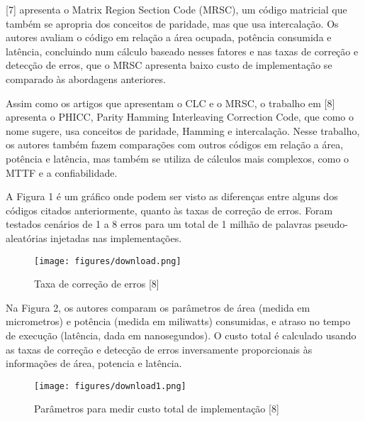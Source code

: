 [7] apresenta o Matrix Region Section Code (MRSC), um código matricial que também se apropria dos conceitos de paridade, mas que usa intercalação. Os autores avaliam o código em relação a área ocupada, potência consumida e latência, concluindo num cálculo baseado nesses fatores e nas taxas de correção e detecção de erros, que o MRSC apresenta baixo custo de implementação se comparado às abordagens anteriores.

Assim como os artigos que apresentam o CLC e o MRSC, o trabalho em [8] apresenta o PHICC, Parity Hamming Interleaving Correction Code, que como o nome sugere, usa conceitos de paridade, Hamming e intercalação.  Nesse trabalho, os autores também fazem comparações com outros códigos em relação a área, potência e latência, mas também se utiliza de cálculos mais complexos, como o MTTF e a confiabilidade.

A Figura 1 é um gráfico onde podem ser visto as diferenças entre alguns dos códigos citados anteriormente, quanto às taxas de correção de erros. Foram testados cenários de 1 a 8 erros para um total de 1 milhão de palavras pseudo-aleatórias injetadas nas implementações.

\begin{figure}[ht]
\centering
\texttt{[image: figures/download.png]}
\caption{Taxa de correção de erros [8]}
\label{fig:taxadecorrecao}
\end{figure}

Na Figura 2, os autores comparam os parâmetros de área (medida em micrometros) e potência (medida em miliwatts) consumidas, e atraso no tempo de execução (latência, dada em nanosegundos). O custo total é calculado usando as taxas de correção e detecção de erros inversamente proporcionais às informações de área, potencia e latência.

\begin{figure}[ht]
\centering
\texttt{[image: figures/download1.png]}
\caption{Parâmetros para medir custo total de implementação [8]}
\label{fig:parametros}
\end{figure}



